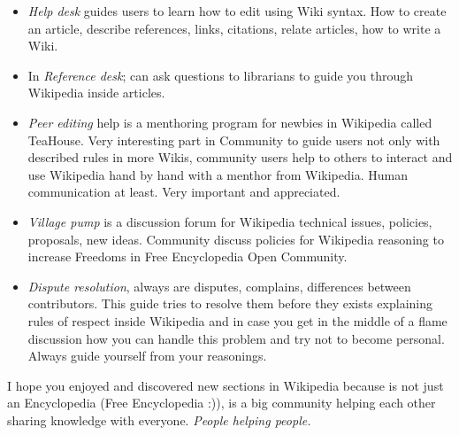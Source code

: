 \begin{itemize}
	\item \textit{Help desk} guides users to learn how to edit using Wiki syntax. How to create an article, describe references, links, citations, relate articles, how to write a Wiki.
	\item In \textit{Reference desk}; \nolinebreakyou can ask questions to librarians to guide you through Wikipedia inside articles.
	\item \textit{Peer editing} help is a menthoring program for newbies in Wikipedia called TeaHouse. Very interesting part in Community to guide users not only with described rules in more Wikis, community users help to others to interact and use Wikipedia hand by hand with a menthor from Wikipedia. Human communication at least. Very important and appreciated.
	\item \textit{Village pump} is a discussion forum for Wikipedia technical issues, policies, proposals, new ideas. Community discuss policies for Wikipedia reasoning to increase Freedoms in Free Encyclopedia Open Community.
	\item \textit{Dispute resolution}, always are disputes, complains, differences between contributors. This guide tries to resolve them before they exists explaining rules of respect inside Wikipedia and in case you get in the middle of a flame discussion how you can handle this problem and try not to become personal. Always guide yourself from your reasonings.
\end{itemize} I hope you enjoyed and discovered new sections in Wikipedia because is not just an Encyclopedia (Free Encyclopedia :)), is a big community helping each other sharing knowledge with everyone. \textit{People helping people.}